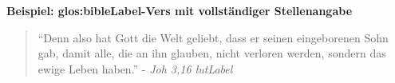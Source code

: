 
\begin{framed}
	\textbf{Beispiel: \gls{glos:bibleLabel}-Vers mit vollständiger Stellenangabe}
	\begin{quote}
		"`Denn also hat Gott die Welt geliebt, dass er seinen eingeborenen Sohn gab, damit alle, die an ihn glauben, nicht verloren werden, sondern das ewige Leben haben."' - \textit{Joh 3,16 \gls{lutLabel}\footnotemark}
	\end{quote}
\end{framed}
